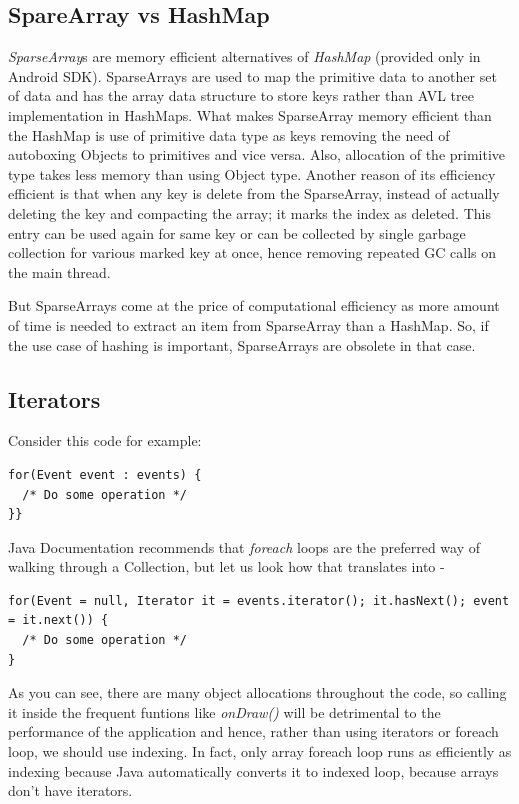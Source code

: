 \documentclass[journal]{IEEEtran}
\begin{document}
\subsection{SpareArray vs HashMap}
\emph{SparseArray}s \cite{sparsearray} are memory efficient alternatives of \emph{HashMap} (provided only in Android SDK). SparseArrays are used to map the primitive data to another set of data and has the array data structure to store keys rather than AVL tree implementation in HashMaps. What makes SparseArray memory efficient than the HashMap is use of primitive data type as keys removing the need of autoboxing Objects to primitives and vice versa. Also, allocation of the primitive type takes less memory than using Object type. Another reason of its efficiency efficient is that when any key is delete from the SparseArray, instead of actually deleting the key and compacting the array; it marks the index as deleted. This entry can be used again for same key or can be collected by single garbage collection for various marked key at once, hence removing repeated GC calls on the main thread.

But SparseArrays come at the price of computational efficiency as more amount of time is needed to extract an item from SparseArray than a HashMap. So, if the use case of hashing is important, SparseArrays are obsolete in that case.

\subsection{Iterators}
Consider this code for example:
\begin{verbatim}
for(Event event : events) {
  /* Do some operation */
}}
\end{verbatim}

Java Documentation recommends that \textit{foreach} loops are the preferred way of walking through a Collection, but let us look how that translates into -
\begin{verbatim}
for(Event = null, Iterator it = events.iterator(); it.hasNext(); event = it.next()) {
  /* Do some operation */
}
\end{verbatim}
As you can see, there are many object allocations throughout the code, so calling it inside the frequent funtions like \textit{onDraw()} will be detrimental to the performance of the application and hence, rather than using iterators or foreach loop, we should use indexing. In fact, only array foreach loop runs as efficiently as indexing because Java automatically converts it to indexed loop, because arrays don't have iterators.
\end{document}
